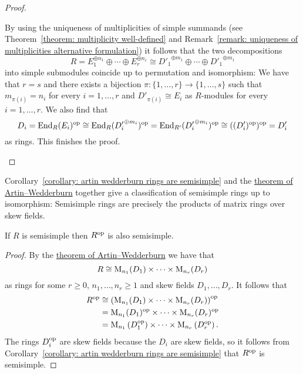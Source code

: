 \begin{proof}
\begin{enumerate}
      By using the uniqueness of multiplicities of simple summands (see Theorem~\ref{theorem: multiplicity well-defined} and Remark~\ref{remark: uniqueness of multiplicities alternative formulation}) it follows that the two decompositions
      \[
              R
        =     E_1^{\oplus n_1} \oplus \dotsb \oplus E_r^{\oplus n_r}
        \cong {D'_1}^{\oplus m_1} \oplus \dotsb \oplus {D'_1}^{\oplus m_1}
      \]
      into simple submodules coincide up to permutation and isomorphism:
      We have that $r = s$ and there exists a bijection $\pi \colon \{1, \dotsc, r\} \to \{1, \dotsc, s\}$ such that $m_{\pi(i)} = n_i$ for every $i = 1, \dotsc, r$ and $D'_{\pi(i)} \cong E_i$ as $R$-modules for every $i = 1, \dotsc, r$.
      We also find that
      \[
              D_i
        =     \operatorname{End}_R(E_i)^{\operatorname{op}}
        \cong \operatorname{End}_R({D'_i}^{\oplus m_i})^{\operatorname{op}}
        =     \operatorname{End}_{R'}({D'_i}^{\oplus m_i})^{\operatorname{op}}
        \cong ((D'_i)^{\operatorname{op}})^{\operatorname{op}}
        =     D'_i
      \]
      as rings.
      This finishes the proof.
    \qedhere
  \end{enumerate}
\end{proof}


\begin{remark}
  Corollary~\ref{corollary: artin wedderburn rings are semisimple} and the \hyperref[theorem: artin wedderburn theorem]{theorem of Artin--Wedderburn} together give a classification of semisimple rings up to isomorphism:
  Semisimple rings are precisely the products of matrix rings over skew fields.
\end{remark}


\begin{corollary}
  If $R$ is semisimple then $R^{\operatorname{op}}$ is also semisimple.
\end{corollary}


\begin{proof}
  By the \hyperref[theorem: artin wedderburn theorem]{theorem of Artin--Wedderburn} we have that
  \[
          R
    \cong \operatorname{M}_{n_1}(D_1) \times \dotsm \times \operatorname{M}_{n_r}(D_r)
  \]
  as rings for some $r \geq 0$, $n_1, \dotsc, n_r \geq 1$ and skew fields $D_1, \dotsc, D_r$.
  It follows that
  \begin{align*}
            R^{\operatorname{op}}
    &\cong  \left( \operatorname{M}_{n_1}(D_1) \times \dotsm \times \operatorname{M}_{n_r}(D_r) \right)^{\operatorname{op}} \\
    &=      \operatorname{M}_{n_1}(D_1)^{\operatorname{op}} \times \dotsm \times \operatorname{M}_{n_r}(D_r)^{\operatorname{op}} \\
    &=      \operatorname{M}_{n_1}\left( D_1^{\operatorname{op}} \right) \times \dotsm \times \operatorname{M}_{n_r}\left( D_r^{\operatorname{op}} \right).
  \end{align*}
  The rings $D_i^{\operatorname{op}}$ are skew fields because the $D_i$ are skew fields, so it follows from Corollary~\ref{corollary: artin wedderburn rings are semisimple} that $R^{\operatorname{op}}$ is semisimple.
\end{proof}


